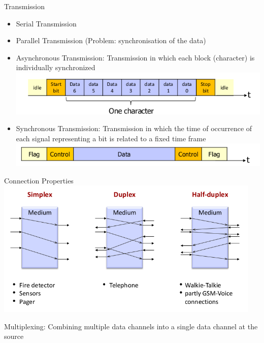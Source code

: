 \documentclass[11pt,ngerman]{article}
\begin{document}
Transmission
\begin{itemize}[noitemsep]
	\item Serial Transmission
	\item Parallel Transmission (Problem: synchronisation of the data)
	\item Asynchronous Transmission:	Transmission	in	which	each	block	
(character)	is	individually	synchronized\\
\includegraphics[width=5in]{images/Selection_002.png}

	\item Synchronous Transmission:	Transmission	in	which	the	time	of	
occurrence	of	each	signal	representing	a	bit	is	related	to	a	fixed	time	
frame \\
\includegraphics[width=5in]{images/Selection_003.png}
\end{itemize}

Connection	Properties\\
\includegraphics[width=5in]{images/Selection_004.png}

Multiplexing:
Combining	multiple	data	
channels	into	a	single	data	
channel	at	the	source\\
\end{document}
